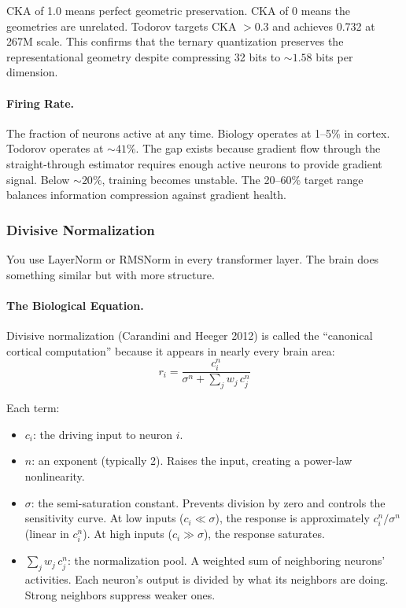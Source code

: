 \documentclass[11pt,a4paper]{article}
\begin{document}
CKA of 1.0 means perfect geometric preservation. CKA of 0 means the geometries are unrelated. Todorov targets CKA $> 0.3$ and achieves 0.732 at 267M scale. This confirms that the ternary quantization preserves the representational geometry despite compressing 32 bits to ${\sim}1.58$ bits per dimension.

\paragraph{Firing Rate.}

The fraction of neurons active at any time. Biology operates at 1--5\% in cortex. Todorov operates at ${\sim}41\%$. The gap exists because gradient flow through the straight-through estimator requires enough active neurons to provide gradient signal. Below ${\sim}20\%$, training becomes unstable. The 20--60\% target range balances information compression against gradient health.

\subsubsection{Divisive Normalization}

You use LayerNorm or RMSNorm in every transformer layer. The brain does something similar but with more structure.

\paragraph{The Biological Equation.}

Divisive normalization (Carandini and Heeger 2012) is called the ``canonical cortical computation'' because it appears in nearly every brain area:
\[
  r_i = \frac{c_i^n}{\sigma^n + \sum_j w_j\, c_j^n}
\]

Each term:
\begin{itemize}
  \item $c_i$: the driving input to neuron $i$.
  \item $n$: an exponent (typically 2). Raises the input, creating a power-law nonlinearity.
  \item $\sigma$: the semi-saturation constant. Prevents division by zero and controls the sensitivity curve. At low inputs ($c_i \ll \sigma$), the response is approximately $c_i^n / \sigma^n$ (linear in $c_i^n$). At high inputs ($c_i \gg \sigma$), the response saturates.
  \item $\sum_j w_j\, c_j^n$: the normalization pool. A weighted sum of neighboring neurons' activities. Each neuron's output is divided by what its neighbors are doing. Strong neighbors suppress weaker ones.
\end{itemize}
\end{document}
